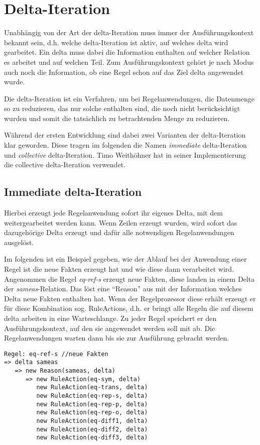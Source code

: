 \section{Delta-Iteration}
\label{abschnitt-delta-iteration}

Unabhängig von der Art der delta-Iteration muss immer der Ausführungskontext bekannt sein, d.h. welche delta-Iteration ist aktiv, auf welches delta wird gearbeitet. Ein delta muss dabei die Information enthalten auf welcher Relation es arbeitet und auf welchen Teil. Zum Ausführungskontext gehört je nach Modus auch noch die Information, ob eine Regel schon auf das Ziel delta angewendet wurde.

Die delta-Iteration ist ein Verfahren, um bei Regelanwendungen, die Datenmenge so zu reduzieren, das nur solche enthalten sind, die noch nicht berücksichtigt wurden und somit die tatsächlich zu betrachtenden Menge zu reduzieren.

Während der ersten Entwicklung sind dabei zwei Varianten der delta-Iteration klar geworden. Diese tragen im folgenden die Namen \emph{immediate} delta-Iteration und \emph{collective} delta-Iteration. Timo Weithöhner hat in seiner Implementierung die collective delta-Iteration verwendet.

\subsection{Immediate delta-Iteration}

Hierbei erzeugt jede Regelanwendung sofort ihr eigenes Delta, mit dem weitergearbeitet werden kann. Wenn Zeilen erzeugt wurden, wird sofort das dazugehörige Delta erzeugt und dafür alle notwendigen Regelanwendungen ausgelöst.

Im folgenden ist ein Beispiel gegeben, wie der Ablauf bei der Anwendung einer Regel ist die neue Fakten erzeugt hat und wie diese dann verarbeitet wird. Angenommen die Regel \emph{eq-ref-s} erzeugt neue Fakten, diese landen in einem Delta der \emph{sameas}-Relation. Das löst eine ``Reason'' aus mit der Information welches Delta neue Fakten enthalten hat. Wenn der Regelprozessor diese erhält erzeugt er für diese Kombination sog. RuleActions, d.h. er bringt alle Regeln die auf diesem delta arbeiten in eine Warteschlange. Zu jeder Regel speichert er den Ausführungskontext, auf den sie angewendet werden soll mit ab. Die Regelanwendungen warten dann bis sie zur Ausführung gebracht werden.

\begin{verbatim}
Regel: eq-ref-s //neue Fakten
=> delta sameas
   => new Reason(sameas, delta)
      => new RuleAction(eq-sym, delta)
         new RuleAction(eq-trans, delta)
         new RuleAction(eq-rep-s, delta)
         new RuleAction(eq-rep-p, delta)
         new RuleAction(eq-rep-o, delta)
         new RuleAction(eq-diff1, delta)
         new RuleAction(eq-diff2, delta)
         new RuleAction(eq-diff3, delta)
\end{verbatim}

